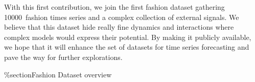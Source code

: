 \documentclass{article} %
\newcommand{\ts}{y}
\newcommand{\rnnparam}{\theta_{corrector}}
\newcommand{\numberts}{10000}
\newcommand{\predictor}{\mathrm{RNN}_p}
\newcommand{\classifier}{\mathrm{RNN}_c}
\newcommand{\hiddenregime}{U}
\begin{document}
With this first contribution, we join the first fashion dataset gathering \numberts\ fashion times series and a complex collection of external signals. We believe that this dataset hide really fine dynamics and interactions where complex models would express their potential. By making it publicly available, we hope that it will enhance the set of datasets for time series forecasting and pave the way for further explorations.





\appendix

\%section{Fashion Dataset overview}



%
%
%
%
%
%
\end{document}
